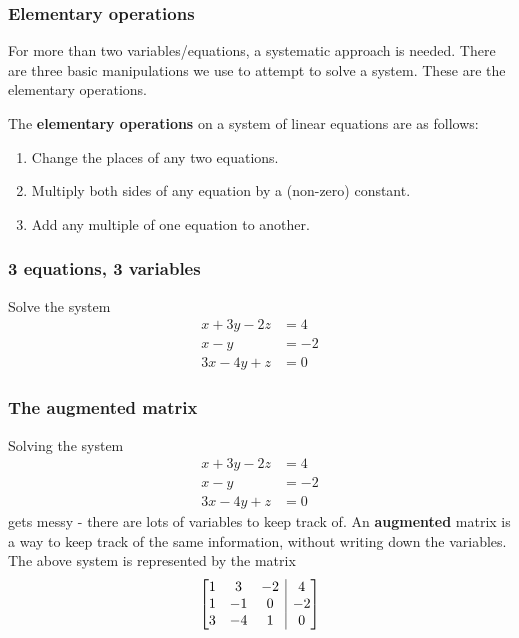 \documentclass[12pt,t]{beamer}
\makeatletter
\newenvironment{amatrix}[1]{%
  \left[\begin{array}{@{}*{#1}{c}|c@{}}
}{%
  \end{array}\right]
}
\makeatother
\begin{document}
\begin{frame}\frametitle{Elementary operations}
 For more than two variables/equations, a systematic approach is needed. There are three basic manipulations we use to attempt to solve a system. These are the \alert{elementary operations}.

\begin{definition}
 The {\bf elementary operations} on a system of linear equations are as follows:
\begin{enumerate}
 \item Change the places of any two equations.
 \item Multiply both sides of any equation by a (non-zero) constant.
 \item Add any multiple of one equation to another.
\end{enumerate}

\end{definition}


\end{frame}
\begin{frame}\frametitle{3 equations, 3 variables}
 \begin{example}
  Solve the system
\begin{align*}
 x +3y-2z &= 4\\
 x  -y \phantom{ + 22z} &= -2\\
 3x -4y+z  &= 0
\end{align*}

 \end{example}

\end{frame}
\begin{frame}\frametitle{The augmented matrix}
 Solving the system
\begin{align*}
 x +3y-2z &= 4\\
 x  -y \phantom{ + 22z} &= -2\\
 3x -4y+z  &= 0
\end{align*}
gets messy - there are lots of variables to keep track of. An {\bf augmented} matrix is a way to keep track of the same information, without writing down the variables. The above system is represented by the matrix
\[
 \begin{amatrix}{3}
  1&3&-2&4\\1&-1&0&-2\\3&-4&1&0
 \end{amatrix}
\]

\end{frame}
\end{document}
